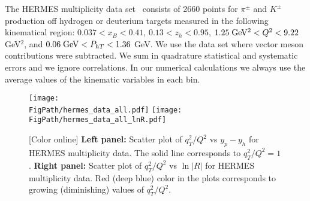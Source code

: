 \documentclass[final,3p,times,onecolumn,sort&compress,hidelinks]{elsarticle}
\newcommand\3[1]{\boldsymbol{#1}}
\newcommand*{\FigPath}{../Figs/}%
\begin{document}
The HERMES multiplicity data set~\cite{Airapetian:2012ki} consists of 2660 points for $\pi^\pm$ and $K^\pm$ production off hydrogen or deuterium targets measured in the following kinematical region: $0.037 < x_B < 0.41$, $0.13 < z_h < 0.95$, $1.25\; {\rm GeV^2} < Q^2 < 9.22$ GeV$^2$,  and $0.06 \; {\rm GeV} < P_{hT} < 1.36$ GeV. We use the data set where vector meson contributions were subtracted. We sum in quadrature statistical and systematic errors and we ignore correlations. In our numerical calculations we always use the average values of the kinematic variables in each bin.
\begin{figure}[htb!]
\centering
\texttt{[image: \\FigPath/hermes\_data\_all.pdf]}
\texttt{[image: \\FigPath/hermes\_data\_all\_lnR.pdf]}
\caption{\label{Fig:hermes_data_rapidity}
[Color online]  {\bf Left panel:} Scatter plot of $q_T^2/Q^2$ vs $y_p-y_h$ for HERMES multiplicity data.  The solid line corresponds to $q_T^2/Q^2=1$. {\bf Right panel:} Scatter plot of $q_T^2/Q^2$  vs $\ln|R|$ for HERMES multiplicity data. Red (deep blue) color in the plots corresponds to growing (diminishing) values of $q_T^2/Q^2$.
}
\end{figure}
\end{document}
